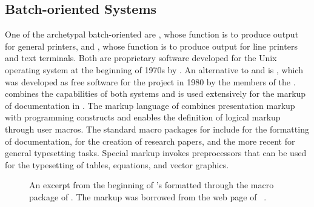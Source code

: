 \subsection{Batch-oriented Systems}
One of the archetypal batch-oriented  are %
, whose function is to produce output for general
printers, and %
, whose function is to
produce output for line printers and text terminals. Both are proprietary
software developed for the Unix operating system at the beginning of 1970s by
. An alternative to  and  is
, which was
developed as free software for the  project in 1980 by the members
of the .  combines the capabilities of both systems
and is used extensively for the markup of documentation in \Unices. The
markup language of  combines presentation markup with
programming constructs and enables the definition of logical markup through user
macros. The standard macro packages for  include
 for the 
formatting of documentation, 
 for the creation of research
papers, and the more recent 
 for general typesetting tasks.
Special markup invokes preprocessors that can be used for the typesetting of
tables, equations, and vector graphics.

\begin{figure}
  \caption{An excerpt from the beginning of 's
     formatted
      through the  macro package of . The
      markup was borrowed from the web page of %
      ~\cite{schaffter15}.}
  \label{fig:poe}
\end{figure}


